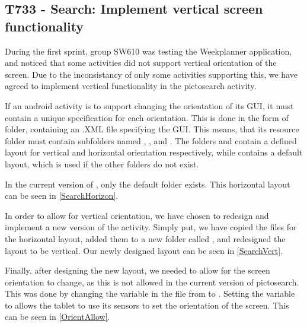 \subsection{T733 - Search: Implement vertical screen functionality}
During the first sprint, group SW610 was testing the Weekplanner application,
and noticed that some activities did not support vertical orientation of the
screen. Due to the inconsistancy of only some activities supporting this, we
have agreed to implement vertical functionality in the pictosearch activity.\nl

If an android activity is to support changing the orientation of its GUI, it
must contain a unique specification for each orientation. This is done in the
form of folder, containing an .XML file specifying the GUI. This means, that its
resource folder  must contain subfolders named ,
, and . The folders 
and  contain a defined layout for vertical and horizontal
orientation respectively, while  contains a default layout, which
is used if the other folders do not exist.\nl

In the current version of , only the default folder
 exists. This horizontal layout can be seen in
\autoref{SearchHorizon}.

    
In order to allow for vertical orientation, we have chosen to redesign and
implement a new version of the activity. Simply put, we have copied the files
for the horizontal layout, added them to a new folder called
, and redesigned the layout to be vertical. Our newly
designed layout can be seen in \autoref{SearchVert}.


Finally, after designing the new layout, we needed to allow for the screen
orientation to change, as this is not allowed in the current version of
pictosearch. This was done by changing the 
variable in the  file from  to
. Setting the variable to  allows the tablet
to use its sensors to set the orientation of the screen. This can be seen in
\autoref{OrientAllow}.\nl

